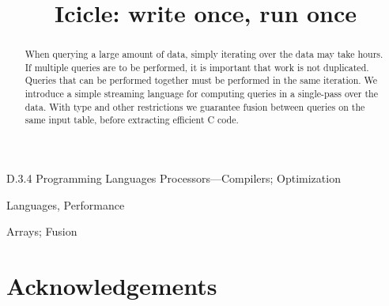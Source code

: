 \documentclass[preprint]{sigplanconf}
\begin{document}
\doi{}

\title{Icicle: write once, run once}


\maketitle
\makeatactive

\begin{abstract}
When querying a large amount of data, simply iterating over the data may take hours.
If multiple queries are to be performed, it is important that work is not duplicated.
Queries that can be performed together must be performed in the same iteration.
We introduce a simple streaming language for computing queries in a single-pass over the data.
With type and other restrictions we guarantee fusion between queries on the same input table, before extracting efficient C code.
\end{abstract}


\category
	{D.3.4}
	{Programming Languages}
	{Processors---Compilers; Optimization}

\terms
	Languages, Performance

\keywords
	Arrays; Fusion






% 


\section*{Acknowledgements}



\end{document}
